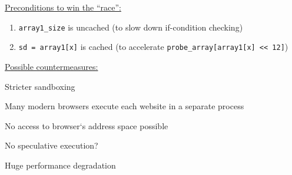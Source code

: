 \documentclass[landscape, a4paper]{article}
\begin{document}
\begin{minipage}[t]{0.2\linewidth}
\begin{betterlist}
\begin{betterlist}
\begin{betterlist}
			\end{betterlist}
		\end{betterlist}
		\item \underline{Preconditions to win the \enquote{race}:}
		\begin{enumerate}
			\item \verb|array1_size| is uncached (to slow down if-condition checking)
			\item \verb|sd = array1[x]| is cached (to accelerate \verb|probe_array[array1[x] << 12]|)
		\end{enumerate}
		\item \underline{Possible countermeasures:}
		\begin{betterlist}
			\item Stricter sandboxing
			\begin{betterlist}
				\item Many modern browsers execute each website in a separate process
				\item No access to browser‘s address space possible
			\end{betterlist}
			\item No speculative execution?
			\begin{betterlist}
				\item Huge performance degradation
			\end{betterlist}
		\end{betterlist}
	\end{betterlist}
\end{minipage}
\end{document}
